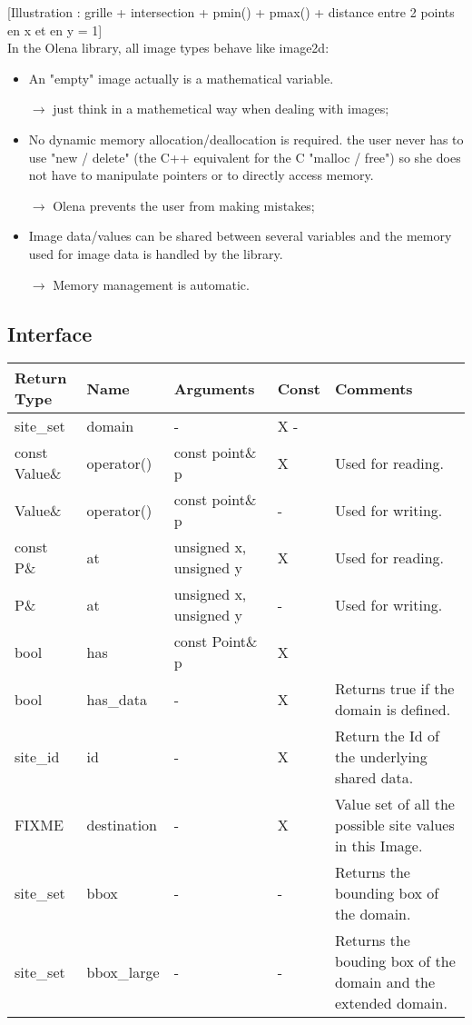 \documentclass{report}
\begin{document}
[Illustration : grille + intersection + pmin() + pmax() + distance entre 2
points en x et en y = 1]\\

In the Olena library, all image types behave like image2d:
\begin{itemize}
\item An "empty" image actually is a mathematical variable.

      $\rightarrow$ just think in a mathemetical way when dealing with images;

\item No dynamic memory allocation/deallocation is required.
    the user never has to use "new / delete" (the C++ equivalent for the C
    "malloc / free") so she does not have to manipulate pointers or to directly
    access memory.
    
    $\rightarrow$ Olena prevents the user from making mistakes;

\item Image data/values can be shared between several variables and the memory
    used for image data is handled by the library.
    
    $\rightarrow$ Memory management is automatic.
\end{itemize}


\subsection{Interface}

\begin{tabular}{|l|l|l|l|p{4cm}|}
\hline
Return Type & Name & Arguments & Const & Comments \\ \hline

site\_set & domain & - & X - &  \\ \hline
const Value\& & operator() & const point\& p & X & Used for reading. \\ \hline
Value\& & operator() & const point\& p & - & Used for writing. \\ \hline
const P\& & at & unsigned x,
         unsigned y & X & Used for reading. \\ \hline
P\& & at & unsigned x,
         unsigned y & - & Used for writing. \\ \hline
bool & has & const Point\& p & X & \\ \hline
bool & has\_data & - & X & Returns true if the domain is defined. \\ \hline
site\_id & id & - & X & Return the Id of the underlying shared data. \\ \hline
FIXME & destination & - & X & Value set of all the possible site values in this
Image. \\ \hline
site\_set & bbox & - & - & Returns the bounding box of the domain. \\ \hline
site\_set & bbox\_large & - & - & Returns the bouding box of the domain and the
extended domain. \\ \hline

\end{tabular}
\end{document}
